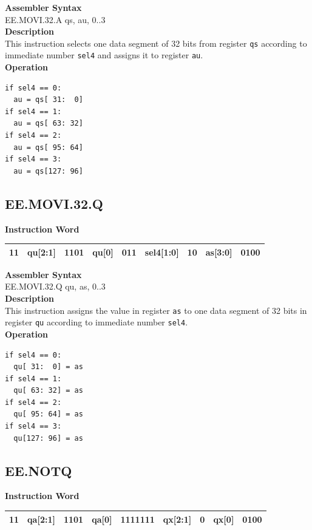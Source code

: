 \textbf{Assembler Syntax} \\
EE.MOVI.32.A qs, au, 0..3 \\
\textbf{Description} \\
This instruction selects one data segment of 32 bits from register \lstinline{qs} according to immediate number \lstinline{sel4} and assigns it to register \lstinline{au}.\\
\textbf{Operation}
\begin{lstlisting}
if sel4 == 0:
  au = qs[ 31:  0]
if sel4 == 1:
  au = qs[ 63: 32]
if sel4 == 2:
  au = qs[ 95: 64]
if sel4 == 3:
  au = qs[127: 96]
\end{lstlisting}

\clearpage
\subsection{EE.MOVI.32.Q}\label{instruction:EEMOVI32Q}
\setlength\tabcolsep{6pt}
\textbf{Instruction Word} \\
\begin{tabular}{|c|c|c|c|c|c|c|c|c|}
	\hline
	11 & qu[2:1] & 1101 & qu[0] & 011 & sel4[1:0] & 10 & as[3:0] & 0100 \\
	\hline
\end{tabular}

\textbf{Assembler Syntax} \\
EE.MOVI.32.Q qu, as, 0..3 \\
\textbf{Description} \\
This instruction assigns the value in register \lstinline{as} to one data segment of 32 bits in register \lstinline{qu} according to immediate number \lstinline{sel4}.\\
\textbf{Operation}
\begin{lstlisting}
if sel4 == 0:
  qu[ 31:  0] = as
if sel4 == 1:
  qu[ 63: 32] = as
if sel4 == 2:
  qu[ 95: 64] = as
if sel4 == 3:
  qu[127: 96] = as
\end{lstlisting}

\clearpage
\subsection{EE.NOTQ}\label{instruction:EENOTQ}
\setlength\tabcolsep{6pt}
\textbf{Instruction Word} \\
\begin{tabular}{|c|c|c|c|c|c|c|c|c|}
	\hline
	11 & qa[2:1] & 1101 & qa[0] & 1111111 & qx[2:1] & 0 & qx[0] & 0100 \\
	\hline
\end{tabular}

